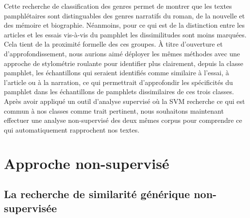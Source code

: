 Cette recherche de classification des genres permet de montrer que les textes pamphlétaires sont distinguables des genres narratifs du roman, de la nouvelle et des mémoire et biographie. Néanmoins, pour ce qui est de la distinction entre les articles et les essais vis-à-vis du pamphlet les dissimilitudes sont moins marquées. Cela tient de la proximité formelle des ces groupes. À titre d'ouverture et d'approfondissement, nous aurions aimé déployer les mêmes méthodes avec une approche de stylométrie roulante pour identifier plus clairement, depuis la classe pamphlet, les échantillons qui seraient identifiés comme similaire à l'essai, à l'article ou à la narration, ce qui permettrait d'approfondir les spécificités du pamphlet dans les échantillons de pamphlets dissimilaires de ces trois classes. 
Après avoir appliqué un outil d'analyse supervisé où la SVM recherche ce qui est commun à nos classes comme trait pertinent, nous souhaitons maintenant effectuer une analyse non-supervisé des deux mêmes corpus pour comprendre ce qui automatiquement rapprochent nos textes.

\chapter{Approche non-supervisé}

\section{La recherche de similarité générique non-supervisée}

